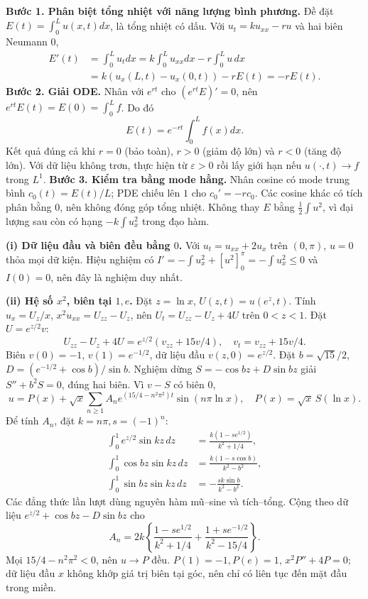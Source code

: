 \textbf{Bước 1. Phân biệt tổng nhiệt với năng lượng bình phương.}
Đề đặt $E(t)=\int_0^Lu(x,t)dx$, là tổng nhiệt có dấu. Với $u_t=ku_{xx}-ru$ và hai biên Neumann $0$,
\begin{align*}
E'(t)&=\int_0^Lu_tdx=k\int_0^Lu_{xx}dx-r\int_0^Lu\,dx\\
&=k(u_x(L,t)-u_x(0,t))-rE(t)=-rE(t).
\end{align*}
\textbf{Bước 2. Giải ODE.}
Nhân với $e^{rt}$ cho $(e^{rt}E)'=0$, nên $e^{rt}E(t)=E(0)=\int_0^Lf$. Do đó
\[E(t)=e^{-rt}\int_0^Lf(x)dx.\]
Kết quả đúng cả khi $r=0$ (bảo toàn), $r>0$ (giảm độ lớn) và $r<0$ (tăng độ lớn). Với dữ liệu không trơn, thực hiện từ $\varepsilon>0$ rồi lấy giới hạn nếu $u(\cdot,t)\to f$ trong $L^1$.
\textbf{Bước 3. Kiểm tra bằng mode hằng.}
Nhân cosine có mode trung bình $c_0(t)=E(t)/L$; PDE chiếu lên $1$ cho $c_0'=-rc_0$. Các cosine khác có tích phân bằng $0$, nên không đóng góp tổng nhiệt. Không thay $E$ bằng $\frac12\int u^2$, vì đại lượng sau còn có hạng $-k\int u_x^2$ trong đạo hàm.

\textbf{(i) Dữ liệu đầu và biên đều bằng $0$.}
Với $u_t=u_{xx}+2u_x$ trên $(0,\pi)$, $u=0$ thỏa mọi dữ kiện. Hiệu nghiệm có $I'=-\int u_x^2+[u^2]_0^\pi=-\int u_x^2\le0$ và $I(0)=0$, nên đây là nghiệm duy nhất.

\textbf{(ii) Hệ số $x^2$, biên tại $1,e$.}
Đặt $z=\ln x$, $U(z,t)=u(e^z,t)$. Tính $u_x=U_z/x$, $x^2u_{xx}=U_{zz}-U_z$, nên $U_t=U_{zz}-U_z+4U$ trên $0<z<1$. Đặt $U=e^{z/2}v$:
\[U_{zz}-U_z+4U=e^{z/2}(v_{zz}+15v/4),\quad v_t=v_{zz}+15v/4.\]
Biên $v(0)=-1$, $v(1)=e^{-1/2}$, dữ liệu đầu $v(z,0)=e^{z/2}$. Đặt $b=\sqrt{15}/2$, $D=(e^{-1/2}+\cos b)/\sin b$. Nghiệm dừng $S=-\cos bz+D\sin bz$ giải $S''+b^2S=0$, đúng hai biên. Vì $v-S$ có biên $0$,
\[u=P(x)+\sqrt x\sum_{n\ge1}A_ne^{(15/4-n^2\pi^2)t}\sin(n\pi\ln x),\quad
P(x)=\sqrt x\,S(\ln x).\]
Để tính $A_n$, đặt $k=n\pi,s=(-1)^n$:
\begin{align*}
\int_0^1e^{z/2}\sin kz\,dz&=\frac{k(1-se^{1/2})}{k^2+1/4},\\
\int_0^1\cos bz\sin kz\,dz&=\frac{k(1-s\cos b)}{k^2-b^2},\\
\int_0^1\sin bz\sin kz\,dz&=-\frac{sk\sin b}{k^2-b^2}.
\end{align*}
Các đẳng thức lần lượt dùng nguyên hàm mũ–sine và tích–tổng. Cộng theo dữ liệu $e^{z/2}+\cos bz-D\sin bz$ cho
\[A_n=2k\left\{\frac{1-se^{1/2}}{k^2+1/4}
+\frac{1+se^{-1/2}}{k^2-15/4}\right\}.\]
Mọi $15/4-n^2\pi^2<0$, nên $u\to P$ đều. $P(1)=-1,P(e)=1$, $x^2P''+4P=0$; dữ liệu đầu $x$ không khớp giá trị biên tại góc, nên chỉ có liên tục đến mặt đầu trong miền.

